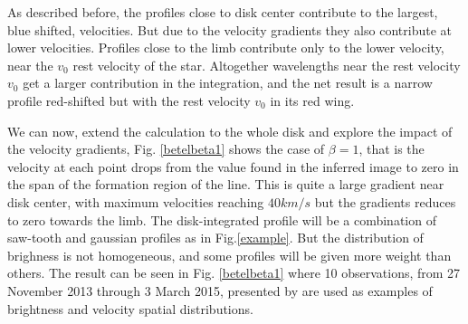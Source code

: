 \documentclass{/Users/art2/TeX/aanda/aa}
\begin{document}
As described before, the profiles close to disk center contribute to the largest, blue shifted, velocities. But due to the velocity gradients they 
also contribute at lower velocities. Profiles close to the limb contribute only to the lower velocity, near the $v_0$ rest velocity of the star. 
Altogether wavelengths near the rest velocity $v_0$ get a larger contribution in the integration, and the net result is a narrow profile red-shifted
but with the rest velocity $v_0$ in its red wing.


We can now, extend the calculation to the whole disk and explore the impact of the velocity gradients, Fig. \ref{betelbeta1} shows the case 
of $\beta=1$, that is the velocity at each point drops from the value found in the inferred image to zero 
in the span of the formation region of the line. This is quite a large gradient near disk center, with maximum velocities reaching 
$40 km/s$ but the gradients reduces to  zero towards the limb. The disk-integrated profile will be a combination of saw-tooth and gaussian 
profiles as in Fig.\ref{example}. But the distribution of brighness is not homogeneous, and some profiles will be given more weight 
than others. The result can be seen in Fig. \ref{betelbeta1} where  10 observations, from 27 November 2013 through 3 March 2015, presented by 
\cite{auriere_discovery_2016} are used as examples of brightness and velocity spatial distributions.
\end{document}
